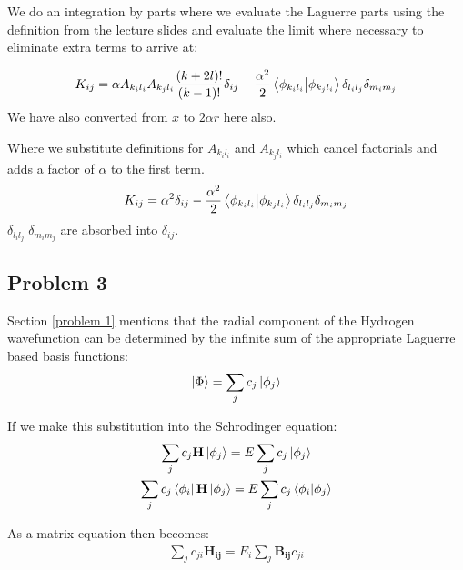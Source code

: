 \documentclass{article}
\renewcommand{\vec}[1]{\mathbf{#1}}
\begin{document}
    We do an integration by parts where we evaluate the Laguerre parts using the definition from the lecture slides and evaluate the limit where necessary to eliminate extra terms to arrive at:
    
    \large
    \begin{gather}
    	K_{ij} = \alpha A_{k_il_i} A_{k_jl_i} \frac{(k+2l)!}{(k-1)!}\delta_{ij} -
    	\frac{\alpha^2}{2} \braket{\phi_{k_il_i}}{\phi_{k_jl_i}}\delta_{l_il_j} \delta_{m_im_j}
    \end{gather}
    \normalsize
    We have also converted from $x$ to $2\alpha r$ here also.
    
    
    Where we substitute definitions for $A_{k_il_i}$ and  $A_{k_jl_i}$ which cancel factorials and adds a factor of $\alpha$ to the first term.
    \large
    \begin{gather}
    	K_{ij} = \alpha^2\delta_{ij} -
    	\frac{\alpha^2}{2} \braket{\phi_{k_il_i}}{\phi_{k_jl_i}}\delta_{l_il_j} \delta_{m_im_j}
    \end{gather}
    \normalsize
    $\delta_{l_il_j}\; \delta_{m_im_j}$ are absorbed into $\delta_{ij}. $


 
    
    \subsection{Problem 3}
    
    
    Section \ref{problem 1} mentions that the radial component of the Hydrogen wavefunction can be determined by the infinite sum of the appropriate Laguerre based basis functions:
    \large
    \begin{gather}
    	\ket{\Phi} = \sum_{j}c_j\ket{\phi_j}
    \end{gather}
    \normalsize
    
    If we make this substitution into the Schrodinger equation:
    \large
    \begin{gather}
    	\sum_{j}c_j\vec{H}\ket{\phi_j} = E\sum_{j}c_j\ket{\phi_j}\\
    	\sum_{j}c_j\bra{\phi_i}\vec{H}\ket{\phi_j} = E\sum_{j}c_j\bra{\phi_i}\ket{\phi_j}
    \end{gather}
    \normalsize
    
    As a matrix equation then becomes:
    \large
    \begin{gather}
    	\sum_{j}c_{ji}\vec{H_{ij}} = E_i\sum_{j}\vec{B_{ij}}c_{ji}
    \end{gather}
    \normalsize
\end{document}
